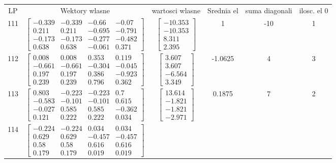 \documentclass[a4paper,12pt]{article}
\begin{document}
\bgroup {} \vspace{0.2in} \begin{tabular}{c c c c c c}
LP &Wektory wlasne & wartosci wlasne & Srednia el & suma diagonali & ilosc. el 0\\
111
&
$\begin{bmatrix} -0.339 & -0.339 & -0.66 & -0.07 \\ 0.211 & 0.211 & -0.695 & -0.791 \\ -0.173 & -0.173 & -0.277 & -0.482 \\ 0.638 & 0.638 & -0.061 & 0.371 \end{bmatrix}$
&
$\begin{bmatrix} -10.353 \\ -10.353 \\ 8.311 \\ 2.395 \end{bmatrix}$
&
1
&
-10
&
1
\\
112
&
$\begin{bmatrix} 0.008 & 0.008 & 0.353 & 0.119 \\ -0.661 & -0.661 & -0.304 & -0.045 \\ 0.197 & 0.197 & 0.386 & -0.923 \\ 0.239 & 0.239 & 0.796 & 0.362 \end{bmatrix}$
&
$\begin{bmatrix} 3.607 \\ 3.607 \\ -6.564 \\ 3.349 \end{bmatrix}$
&
-1.0625
&
4
&
3
\\
113
&
$\begin{bmatrix} 0.803 & -0.223 & -0.223 & 0.7 \\ -0.583 & -0.101 & -0.101 & 0.615 \\ -0.027 & 0.585 & 0.585 & -0.362 \\ 0.121 & 0.222 & 0.222 & 0.034 \end{bmatrix}$
&
$\begin{bmatrix} 13.614 \\ -1.821 \\ -1.821 \\ -2.971 \end{bmatrix}$
&
0.1875
&
7
&
2
\\
114
&
$\begin{bmatrix} -0.224 & -0.224 & 0.034 & 0.034 \\ 0.629 & 0.629 & -0.457 & -0.457 \\ 0.58 & 0.58 & 0.616 & 0.616 \\ 0.179 & 0.179 & 0.019 & 0.019 \end{bmatrix}$

\end{tabular}
\end{document}
